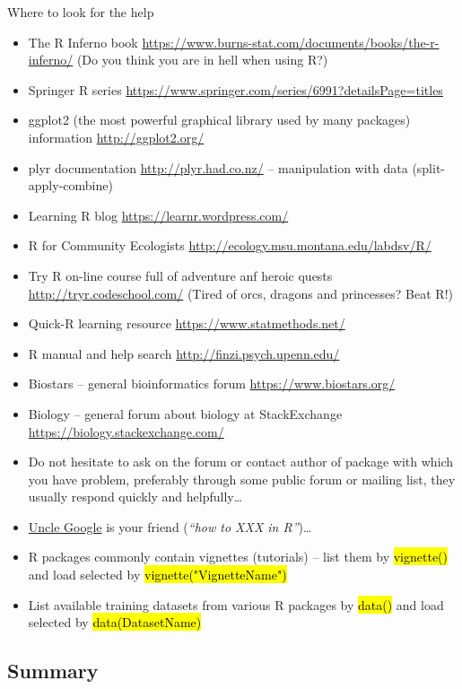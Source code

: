 \documentclass[compress, ucs, xelatex, 11pt, xcolor=svgnames,
  hyperref={
    bookmarks=true,
    unicode=true,
    colorlinks=true,
    pdftitle={Molecular data in R},
    plainpages=false,
    pdfauthor={Vojtech Zeisek},
    pdfsubject={Course about phylogeny and evolution in R},
    pdfcreator={XeLaTeX},
    pdfkeywords={R, evolution, phylogeny, molecular data},
    linkcolor=Tomato,
    anchorcolor=SaddleBrown,
    citecolor=Goldenrod,
    filecolor=DarkMagenta,
    menucolor=Sienna,
    urlcolor=DarkTurquoise,
    pdftex},
  url={hyphens, lowtilde} %
  ]{beamer}
\renewcommand{\texttt}[1]{\hl{\ttfamily #1}}
\begin{document}
\begin{frame}[allowframebreaks]{Where to look for the help}
\begin{itemize}
    \item The R Inferno book \url{https://www.burns-stat.com/documents/books/the-r-inferno/} (Do you think you are in hell when using R?)
    \item Springer R series \url{https://www.springer.com/series/6991?detailsPage=titles}
    \item ggplot2 (the most powerful graphical library used by many packages) information \url{http://ggplot2.org/}
    \item plyr documentation \url{http://plyr.had.co.nz/} -- manipulation with data (split-apply-combine)
    \item Learning R blog \url{https://learnr.wordpress.com/}
    \item R for Community Ecologists \url{http://ecology.msu.montana.edu/labdsv/R/}
    \item Try R on-line course full of adventure anf heroic quests \url{http://tryr.codeschool.com/} (Tired of orcs, dragons and princesses? Beat R!)
    \item Quick-R learning resource \url{https://www.statmethods.net/}
    \item R manual and help search \url{http://finzi.psych.upenn.edu/}
    \item Biostars -- general bioinformatics forum \url{https://www.biostars.org/}
    \item Biology -- general forum about biology at StackExchange \url{https://biology.stackexchange.com/}
    \item Do not hesitate to ask on the forum or contact author of package with which you have problem, preferably through some public forum or mailing list, they usually respond quickly and helpfully\ldots
    \item \href{http://rseek.org/}{Uncle Google} is your friend (\textit{``how to XXX in R''})\ldots
    \item R packages commonly contain vignettes (tutorials) -- list them by \texttt{vignette()} and load selected by \texttt{vignette("VignetteName")}
    \item List available training datasets from various R packages by \texttt{data()} and load selected by \texttt{data(DatasetName)}
  \end{itemize}
\end{frame}

\subsection{Summary}
\end{document}
